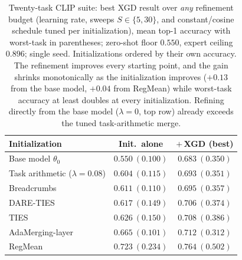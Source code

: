 \documentclass{article} %
\begin{document}
\begin{table}[t]
\centering
\small
\setlength{\tabcolsep}{5pt}
\caption{Twenty-task CLIP suite: best XGD result over \emph{any} refinement budget (learning rate, sweeps $S\in\{5,30\}$, and constant/cosine schedule tuned per initialization), mean top-1 accuracy with worst-task in parentheses; zero-shot floor $0.550$, expert ceiling $0.896$; single seed. Initializations ordered by their own accuracy. The refinement improves every starting point, and the gain shrinks monotonically as the initialization improves ($+0.13$ from the base model, $+0.04$ from RegMean) while worst-task accuracy at least doubles at every initialization. Refining directly from the base model ($\lambda=0$, top row) already exceeds the tuned task-arithmetic merge.}
\label{tab:clip20budget}
\begin{tabular}{lcc}
\toprule
Initialization & Init.\ alone & $+$\,XGD (best) \\
\midrule
Base model $\theta_0$              & $0.550\ (0.100)$ & $\mathbf{0.683}\ (0.350)$ \\
Task arithmetic ($\lambda{=}0.08$) & $0.604\ (0.115)$ & $\mathbf{0.693}\ (0.351)$ \\
Breadcrumbs                        & $0.611\ (0.110)$ & $\mathbf{0.695}\ (0.357)$ \\
DARE-TIES                          & $0.617\ (0.149)$ & $\mathbf{0.706}\ (0.374)$ \\
TIES                               & $0.626\ (0.150)$ & $\mathbf{0.708}\ (0.386)$ \\
AdaMerging-layer                   & $0.665\ (0.101)$ & $\mathbf{0.712}\ (0.312)$ \\
RegMean                            & $0.723\ (0.234)$ & $\mathbf{0.764}\ (0.502)$ \\
\bottomrule
\end{tabular}
\end{table}
\end{document}
